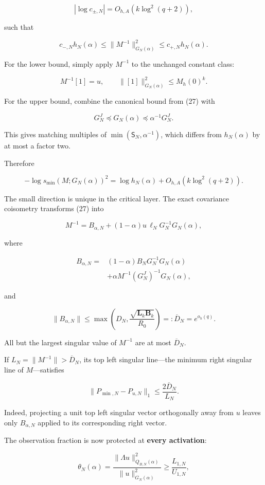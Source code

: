 \documentclass[11pt]{article}
\begin{document}
\[
|\log c_{\pm,N}|=O_{h,A}(k\log^2(q+2)),
\]

such that

\[
\boxed{
c_{-,N}h_N(\alpha)
\le
\|M^{-1}\|_{G_N(\alpha)}^2
\le
c_{+,N}h_N(\alpha).
}
\tag{28}
\]

For the lower bound, simply apply \(M^{-1}\) to the unchanged constant class:

\[
M^{-1}[1]=u,\qquad
\|[1]\|_{G_N(\alpha)}^2\le M_h(0)^k.
\]

For the upper bound, combine the canonical bound from (27) with

\[
G_N^J\preceq G_N(\alpha)\preceq\alpha^{-1}G_N^J.
\]

This gives matching multiples of \(\min(\mathsf S_N,\alpha^{-1})\), which differs from \(h_N(\alpha)\) by at most a factor two.

Therefore

\[
\boxed{
-\log s_{\min}(M;G_N(\alpha))^2
=
\log h_N(\alpha)+O_{h,A}(k\log^2(q+2)).
}
\tag{29}
\]

The small direction is unique in the critical layer. The exact covariance coisometry transforms (27) into

\[
\boxed{
M^{-1}
=
B_{\alpha,N}
+(1-\alpha)u\,\ell_NG_N^{-1}G_N(\alpha),
}
\tag{30}
\]

where

\[
\begin{aligned}
B_{\alpha,N}
={}&(1-\alpha)B_NG_N^{-1}G_N(\alpha)\\
&+\alpha M^{-1}(G_N^J)^{-1}G_N(\alpha),
\end{aligned}
\]

and

\[
\|B_{\alpha,N}\|
\le\max\left(D_N,\frac{\sqrt{\mathbf L_k\mathbf B_k}}{R_0}\right)
=:\overline D_N=e^{o_h(q)}.
\]

All but the largest singular value of \(M^{-1}\) are at most \(\overline D_N\).

If \(L_N=\|M^{-1}\|>\overline D_N\), its top left singular line---the minimum right singular line of \(M\)---satisfies

\[
\boxed{
\|P_{\min,N}-P_{u,N}\|_1
\le\frac{2\overline D_N}{L_N}.
}
\tag{31}
\]

Indeed, projecting a unit top left singular vector orthogonally away from \(u\) leaves only \(B_{\alpha,N}\) applied to its corresponding right vector.

The observation fraction is now protected at \textbf{every activation}:

\[
\theta_N(\alpha)
=
\frac{\|\Lambda u\|_{Q_{B,N}(\alpha)}^2}
{\|u\|_{G_N(\alpha)}^2}
\ge\frac{L_{1,N}}{U_{1,N}},
\]
\end{document}
